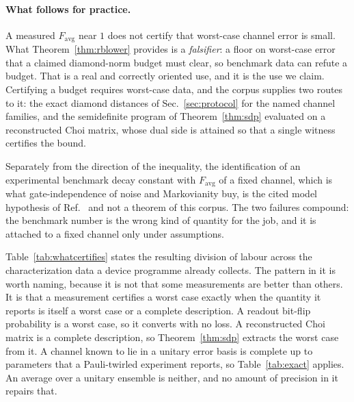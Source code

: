\documentclass[aps,pra,reprint,nofootinbib,superscriptaddress]{revtex4-2}
\theoremstyle{plain}
\theoremstyle{definition}
\theoremstyle{remark}
\begin{document}
\paragraph*{What follows for practice.} A measured $F_{\mathrm{avg}}$
near $1$ does not certify that worst-case channel error is small. What
Theorem~\ref{thm:rblower} provides is a \emph{falsifier}: a floor on
worst-case error that a claimed diamond-norm budget must clear, so
benchmark data can refute a budget. That is a real and correctly oriented
use, and it is the use we claim. Certifying a budget requires worst-case
data, and the corpus supplies two routes to it: the exact diamond
distances of Sec.~\ref{sec:protocol} for the named channel families, and
the semidefinite program of Theorem~\ref{thm:sdp} evaluated on a
reconstructed Choi matrix, whose dual side is attained so that a single
witness certifies the bound.

Separately from the direction of the inequality, the identification of an
experimental benchmark decay constant with $F_{\mathrm{avg}}$ of a fixed
channel, which is what gate-independence of noise and Markovianity buy,
is the cited model hypothesis of Ref.~\cite{Magesan2011} and not a
theorem of this corpus. The two failures compound: the benchmark number
is the wrong kind of quantity for the job, and it is attached to a fixed
channel only under assumptions.

Table~\ref{tab:whatcertifies} states the resulting division of labour
across the characterization data a device programme already collects. The
pattern in it is worth naming, because it is not that some measurements
are better than others. It is that a measurement certifies a worst case
exactly when the quantity it reports is itself a worst case or a complete
description. A readout bit-flip probability is a worst case, so it
converts with no loss. A reconstructed Choi matrix is a complete
description, so Theorem~\ref{thm:sdp} extracts the worst case from it. A
channel known to lie in a unitary error basis is complete up to
parameters that a Pauli-twirled experiment reports, so
Table~\ref{tab:exact} applies. An average over a unitary ensemble is
neither, and no amount of precision in it repairs that.

\begin{table}
\caption{What each kind of characterization datum certifies about
worst-case channel error, within the stated model. The distinction is not
precision but kind: a datum certifies a worst case when it is itself a
worst case or a complete description of the channel.}
\label{tab:whatcertifies}
\begin{ruledtabular}
\footnotesize

\end{ruledtabular}
\end{table}
\end{document}
